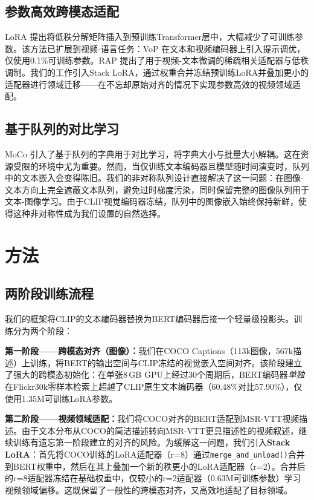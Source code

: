 \documentclass[10pt,a4paper]{ctexart}
\begin{document}
\subsection{参数高效跨模态适配}

LoRA \citep{hu2022lora}提出将低秩分解矩阵插入到预训练Transformer层中，大幅减少了可训练参数。该方法已扩展到视频-语言任务：VoP \citep{huang2023vop}在文本和视频编码器上引入提示调优，仅使用0.1\%可训练参数。RAP \citep{cao2024acl}提出了用于视频-文本微调的稀疏相关适配器与低秩调制。我们的工作引入Stack LoRA，通过权重合并冻结预训练LoRA并叠加更小的适配器进行领域迁移——在不忘却原始对齐的情况下实现参数高效的视频领域适配。

\subsection{基于队列的对比学习}

MoCo \citep{he2020moco}引入了基于队列的字典用于对比学习，将字典大小与批量大小解耦。这在资源受限的环境中尤为重要。然而，当仅训练文本编码器且模型随时间演变时，队列中的文本嵌入会变得陈旧。我们的非对称队列设计直接解决了这一问题：在图像-文本方向上完全遮蔽文本队列，避免过时梯度污染，同时保留完整的图像队列用于文本-图像学习。由于CLIP视觉编码器冻结，队列中的图像嵌入始终保持新鲜，使得这种非对称性成为我们设置的自然选择。

\section{方法}

\subsection{两阶段训练流程}

我们的框架将CLIP的文本编码器替换为BERT编码器后接一个轻量级投影头。训练分为两个阶段：

\textbf{第一阶段——跨模态对齐（图像）：}我们在COCO Captions（113k图像，567k描述）上训练，将BERT的输出空间与CLIP冻结的视觉嵌入空间对齐。该阶段建立了强大的跨模态初始化：在单张8\,GB GPU上经过30个周期后，BERT编码器\emph{单独}在Flickr30k零样本检索上超越了CLIP原生文本编码器（60.48\%对比57.90\%），仅使用1.35M可训练LoRA参数。

\textbf{第二阶段——视频领域适配：}我们将COCO对齐的BERT适配到MSR-VTT视频描述。由于文本分布从COCO的简洁描述转向MSR-VTT更具描述性的视频叙述，继续训练有遗忘第一阶段建立的对齐的风险。为缓解这一问题，我们引入\textbf{Stack LoRA}：首先将COCO训练的LoRA适配器（r=8）通过\texttt{merge\_and\_unload()}合并到BERT权重中，然后在其上叠加一个新的秩更小的LoRA适配器（r=2）。合并后的r=8适配器冻结在基础权重中，仅较小的r=2适配器（0.63M可训练参数）学习视频领域偏移。这既保留了一般性的跨模态对齐，又高效地适配了目标领域。
\end{document}
